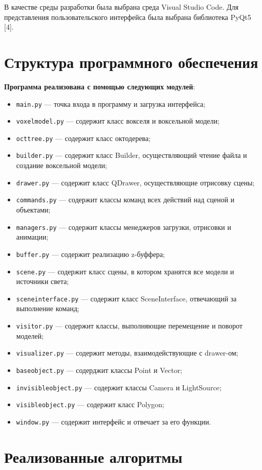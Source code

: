 В качестве среды разработки была выбрана среда Visual Studio Code. Для представления пользовательского интерфейса была выбрана библиотека PyQt5 [4].

\section{Структура программного обеспечения}
\textbf{Программа реализована с помощью следующих модулей}:
\begin{itemize}
	\item \verb;main.py; --- точка входа в программу и загрузка интерфейса;
	\item \verb;voxelmodel.py; --- содержит класс вокселя и воксельной модели;
	\item \verb;octtree.py; --- содержит класс октодерева;
	\item \verb;builder.py; --- содержит класс Builder, осуществляющий чтение файла и создание воксельной модели;
	\item \verb;drawer.py; --- содержит класс QDrawer, осуществляющие отрисовку сцены;
	\item \verb;commands.py; --- содержит классы команд всех действий над сценой и объектами;
	\item \verb;managers.py; --- содержит классы менеджеров загрузки, отрисовки и анимации;
	\item \verb;buffer.py; --- содержит реализацию z-буффера;
	\item \verb;scene.py; --- содержит класс сцены, в котором хранятся все модели и источники света;
	\item \verb;sceneinterface.py; --- содержит класс SceneInterface, отвечающий за выполнение команд;
	\item \verb;visitor.py; --- содержит классы, выполняющие перемещение и поворот моделей;
	\item \verb;visualizer.py; --- содержит методы, взаимодействующие с drawer-ом;
	\item \verb;baseobject.py; --- содерджит классы Point и Vector;
	\item \verb;invisibleobject.py; --- содержит классы Camera и LightSource;
	\item \verb;visibleobject.py; --- содержит класс Polygon;
	\item \verb;window.py; --- содержит интерфейс и отвечает за его функции.
\end{itemize}

\section{Реализованные алгоритмы}

